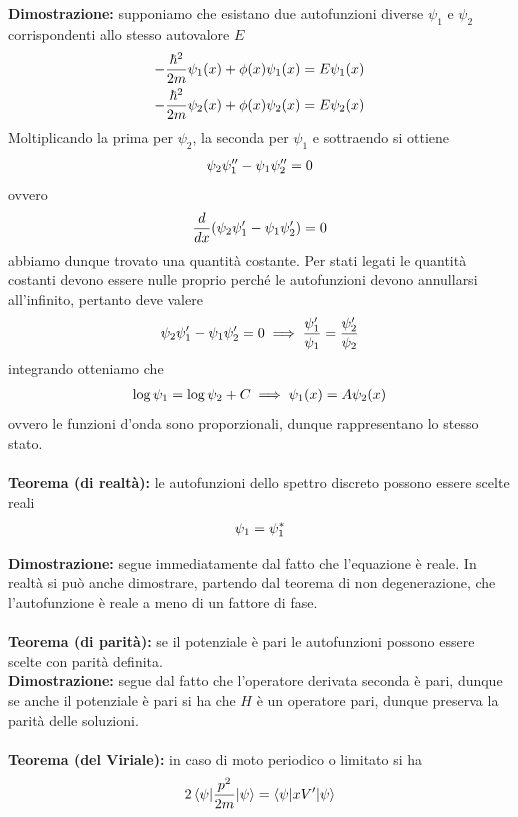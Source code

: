 \documentclass{article}
\begin{document}
\textbf{Dimostrazione:} supponiamo che esistano due autofunzioni diverse $\psi_1$ e $\psi_2$ corrispondenti allo stesso autovalore $E$
\begin{gather}
    -\frac{\hbar^2}{2m}\psi_1(x) + \phi(x)\psi_1(x) = E\psi_1(x) \notag \\
    -\frac{\hbar^2}{2m}\psi_2(x) + \phi(x)\psi_2(x) = E\psi_2(x) \notag 
\end{gather}
Moltiplicando la prima per $\psi_2$, la seconda per $\psi_1$ e sottraendo si ottiene
\begin{gather}
    \psi_2\psi_1'' - \psi_1\psi_2'' = 0 \notag
\end{gather}
ovvero
\begin{gather}
    \frac{d}{dx}(\psi_2\psi'_1 - \psi_1\psi'_2) = 0 \notag
\end{gather}
abbiamo dunque trovato una quantità costante. Per stati legati le quantità costanti devono essere nulle proprio perché le autofunzioni devono annullarsi all'infinito, pertanto deve valere
\begin{gather}
    \psi_2\psi'_1 - \psi_1\psi'_2 = 0 \implies \frac{\psi'_1}{\psi_1} = \frac{\psi'_2}{\psi_2} \notag
\end{gather}
integrando otteniamo che
\begin{gather}
    \log \psi_1 = \log \psi_2 + C \implies \psi_1(x) = A\psi_2(x) \notag
\end{gather}
ovvero le funzioni d'onda sono proporzionali, dunque rappresentano lo stesso stato. \\ \\
\textbf{Teorema (di realtà):} le autofunzioni dello spettro discreto possono essere scelte reali
\begin{gather}
    \psi_1 = \psi_1^* \notag 
\end{gather}

\textbf{Dimostrazione:} segue immediatamente dal fatto che l'equazione è reale. In realtà si può anche dimostrare, partendo dal teorema di non degenerazione, che l'autofunzione è reale a meno di un fattore di fase. \\ \\
\textbf{Teorema (di parità):} se il potenziale è pari le autofunzioni possono essere scelte con parità definita. \\

\textbf{Dimostrazione:} segue dal fatto che l'operatore derivata seconda è pari, dunque se anche il potenziale è pari si ha che $H$ è un operatore pari, dunque preserva la parità delle soluzioni. \\ \\
\textbf{Teorema (del Viriale):} in caso di moto periodico o limitato si ha
\begin{gather}
    2\braket{\psi|\frac{p^2}{2m}|\psi} = \braket{\psi|xV'|\psi} \notag
\end{gather}
\end{document}
